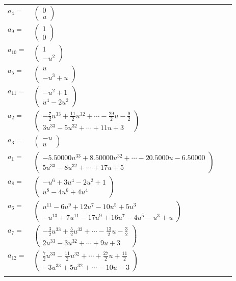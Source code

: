 \documentclass[1p]{elsarticle_modified}
\theoremstyle{definition}
\begin{document}
\begin{tabular}{m{7pt} m{180pt} m{7pt} m{180pt} }
\flushright $a_{4}=$&$\begin{pmatrix}0\\u\end{pmatrix}$ \\
\flushright $a_{9}=$&$\begin{pmatrix}1\\0\end{pmatrix}$ \\
\flushright $a_{10}=$&$\begin{pmatrix}1\\- u^2\end{pmatrix}$ \\
\flushright $a_{5}=$&$\begin{pmatrix}u\\- u^3+u\end{pmatrix}$ \\
\flushright $a_{11}=$&$\begin{pmatrix}- u^2+1\\u^4-2 u^2\end{pmatrix}$ \\
\flushright $a_{2}=$&$\begin{pmatrix}-\frac{7}{2} u^{33}+\frac{11}{2} u^{32}+\cdots-\frac{29}{2} u-\frac{9}{2}\\3 u^{33}-5 u^{32}+\cdots+11 u+3\end{pmatrix}$ \\
\flushright $a_{3}=$&$\begin{pmatrix}- u\\u\end{pmatrix}$ \\
\flushright $a_{1}=$&$\begin{pmatrix}-5.50000 u^{33}+8.50000 u^{32}+\cdots-20.5000 u-6.50000\\5 u^{33}-8 u^{32}+\cdots+17 u+5\end{pmatrix}$ \\
\flushright $a_{8}=$&$\begin{pmatrix}- u^6+3 u^4-2 u^2+1\\u^8-4 u^6+4 u^4\end{pmatrix}$ \\
\flushright $a_{6}=$&$\begin{pmatrix}u^{11}-6 u^9+12 u^7-10 u^5+5 u^3\\- u^{13}+7 u^{11}-17 u^9+16 u^7-4 u^5- u^3+u\end{pmatrix}$ \\
\flushright $a_{7}=$&$\begin{pmatrix}-\frac{3}{2} u^{33}+\frac{5}{2} u^{32}+\cdots-\frac{13}{2} u-\frac{3}{2}\\2 u^{33}-3 u^{32}+\cdots+9 u+3\end{pmatrix}$ \\
\flushright $a_{12}=$&$\begin{pmatrix}\frac{7}{2} u^{33}-\frac{11}{2} u^{32}+\cdots+\frac{27}{2} u+\frac{11}{2}\\-3 u^{33}+5 u^{32}+\cdots-10 u-3\end{pmatrix}$\\&\end{tabular}
\end{document}

